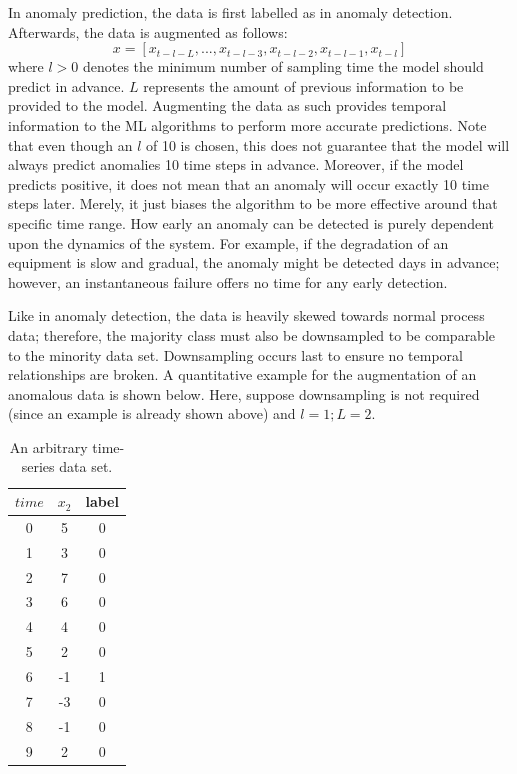In anomaly prediction, the data is first labelled as in anomaly detection. Afterwards, the data is augmented as follows:
\begin{equation}
    x = [x_{t - l - L}, ...,  x_{t - l - 3}, x_{t - l - 2},  x_{t - l - 1},  x_{t - l}]
    \label{eq:03prediction}
\end{equation}
where $l > 0$ denotes the minimum number of sampling time the model should predict in advance.  $L$ represents the amount of previous information to be provided to the model. Augmenting the data as such provides temporal information to the ML algorithms to perform more accurate predictions. Note that even though an $l$ of 10 is chosen, this does not guarantee that the model will always predict anomalies 10 time steps in advance. Moreover, if the model predicts positive, it does not mean that an anomaly will occur exactly 10 time steps later. Merely, it just biases the algorithm to be more effective around that specific time range. How early an anomaly can be detected is purely dependent upon the dynamics of the system.  For example, if the degradation of an equipment is slow and gradual, the anomaly might be detected days in advance; however, an instantaneous failure offers no time for any early detection.

Like in anomaly detection, the data is heavily skewed towards normal process data; therefore, the majority class must also be downsampled to be comparable to the minority data set. Downsampling occurs last to ensure no temporal relationships are broken. A quantitative example for the augmentation of an anomalous data is shown below.  Here, suppose downsampling is not required (since an example is already shown above) and $l = 1; L = 2$.

\begin{table}[H]
    \centering
    \begin{tabular}{ c | c | c }
        $time$ & $x_2$ & label \\
        \hline
        0 & 5 & 0 \\
        1 & 3 & 0 \\
        2 & 7 & 0 \\
        3 & 6 & 0 \\
        4 & 4 & 0 \\
        5 & 2 & 0 \\
        6 & -1 & 1 \\
        7 & -3 & 0 \\
        8 & -1 & 0 \\
        9 & 2 & 0 \\
    \end{tabular}
    \caption{An arbitrary time-series data set.}
    \label{tab:03aug}
\end{table}

